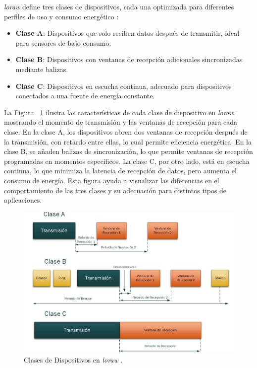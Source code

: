 \textit{\acrshort{loraw}} define tres clases de dispositivos, cada una optimizada para diferentes perfiles de uso y consumo energético \cite{doc_aboutlorawan, doc_lorawanstandardsemtech}:
\begin{itemize}
    \item \textbf{Clase A}: Dispositivos que solo reciben datos después de transmitir, ideal para sensores de bajo consumo.
    \item \textbf{Clase B}: Dispositivos con ventanas de recepción adicionales sincronizadas mediante balizas.
    \item \textbf{Clase C}: Dispositivos en escucha continua, adecuado para dispositivos conectados a una fuente de energía constante.
\end{itemize}

La Figura ~\ref{fig:loraclass} ilustra las características de cada clase de dispositivo en \textit{\acrshort{loraw}}, mostrando el momento de transmisión y las ventanas de recepción para cada clase. En la clase A, los dispositivos abren dos ventanas de recepción después de la transmisión, con retardo entre ellas, lo cual permite eficiencia energética. En la clase B, se añaden balizas de sincronización, lo que permite ventanas de recepción programadas en momentos específicos. La clase C, por otro lado, está en escucha continua, lo que minimiza la latencia de recepción de datos, pero aumenta el consumo de energía. Esta figura ayuda a visualizar las diferencias en el comportamiento de las tres clases y su adecuación para distintos tipos de aplicaciones.

\begin{figure}[H]
\leavevmode
\begin{minipage}{\textwidth}
\begin{center}
\includegraphics[scale=0.5]{./capitulo_02/figures/claseslora.png}
\caption{Clases de Dispositivos en \textit{\acrshort{loraw}} \cite{morales2021lorawan}. \label{fig:loraclass}}
\end{center}
\end{minipage}
\end{figure}

